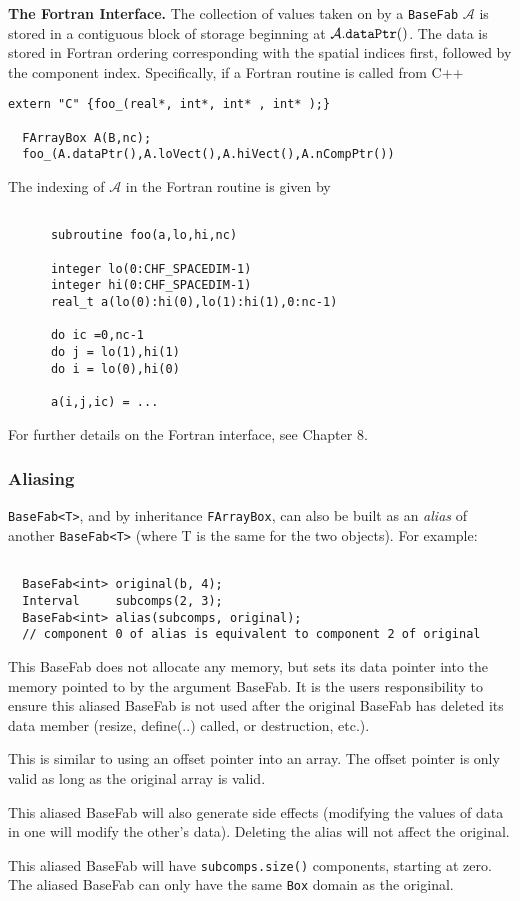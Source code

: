 \noindent
{\bf The Fortran Interface.} The collection of values taken on by a 
{\tt BaseFab} $\mathcal{A}$ is stored in a contiguous block of storage
beginning at $\mathcal{A}.{\tt dataPtr()}$. The data is stored in
Fortran ordering corresponding with the spatial indices first, followed
by the component index. Specifically, if a Fortran routine is called
from C++
\begin{verbatim}
extern "C" {foo_(real*, int*, int* , int* );}

  FArrayBox A(B,nc);
  foo_(A.dataPtr(),A.loVect(),A.hiVect(),A.nCompPtr())

\end{verbatim}
The indexing of $\mathcal{A}$ in the Fortran routine is given by
\begin{verbatim}
      
      subroutine foo(a,lo,hi,nc)
      
      integer lo(0:CHF_SPACEDIM-1)
      integer hi(0:CHF_SPACEDIM-1)
      real_t a(lo(0):hi(0),lo(1):hi(1),0:nc-1)
          
      do ic =0,nc-1
      do j = lo(1),hi(1)
      do i = lo(0),hi(0)

      a(i,j,ic) = ...

\end{verbatim}
For further details on the Fortran interface, see Chapter 8.

\subsubsection{Aliasing}
\label{sec:aliasing}

\verb|BaseFab<T>|, and by inheritance \verb|FArrayBox|, can also be
built as an {\em alias} of another \verb|BaseFab<T>| (where T is the
same for the two objects).  For example:

\begin{verbatim}

  BaseFab<int> original(b, 4);
  Interval     subcomps(2, 3);
  BaseFab<int> alias(subcomps, original);
  // component 0 of alias is equivalent to component 2 of original

\end{verbatim}

 This BaseFab does not allocate any memory, but
 sets its data pointer into the memory pointed to by the argument
 BaseFab.  It is the users responsibility to ensure this aliased
 BaseFab is not used after the original BaseFab has deleted its data member
 (resize, define(..) called, or destruction, etc.).

  This is similar to using an offset pointer into an array. The offset
pointer is only valid as long as the original array is valid.

    This aliased BaseFab will also generate side effects (modifying the values
of data in one will modify the other's data). Deleting the alias will not affect the original.  

This aliased BaseFab will have \verb|subcomps.size()| components, 
starting at zero. The aliased BaseFab can only have the same \verb|Box| domain
as the original.


